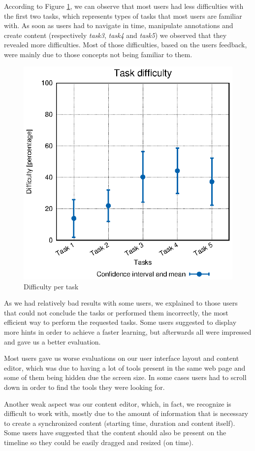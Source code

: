 \documentclass[conference,compsoc,a4paper]{IEEEtran}
\begin{document}
According to Figure \ref{fig:user_diffs}, we can observe that most users had less difficulties with the first two tasks, which represents types of tasks that most users are familiar with. As soon as users had to navigate in time, manipulate annotations and create content (respectively \emph{task3}, \emph{task4} and \emph{task5}) we observed that they revealed more difficulties. Most of those difficulties, based on the users feedback, were mainly due to those concepts not being familiar to them.



\begin{figure}
  \centering
    \includegraphics[width=0.8\linewidth]{stats/user_diffs.eps}
  \caption{Difficulty per task}
  \label{fig:user_diffs}
\end{figure}


As we had relatively bad results with some users, we explained to those users that could not conclude the tasks or performed them incorrectly, the most efficient way to perform the requested tasks. Some users suggested to display more hints in order to achieve a faster learning, but afterwards all were impressed and gave us a better evaluation.

Most users gave us worse evaluations on our user interface layout and content editor, which was due to having a lot of tools present in the same web page and some of them being hidden due the screen size. In some cases users had to scroll down in order to find the tools they were looking for. 

Another weak aspect was our content editor, which, in fact, we recognize is difficult to work with, mostly due to the amount of information that is necessary to create a synchronized content (starting time, duration and content itself). Some users have suggested that the content should also be present on the timeline so they could be easily dragged and resized (on time).
\end{document}
